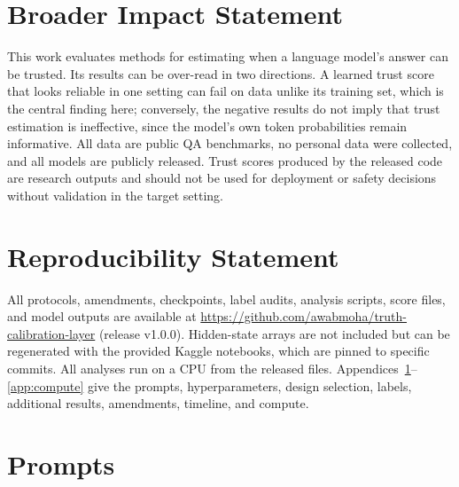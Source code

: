 \documentclass[10pt]{article}
\newif\ifanon
\newcommand{\repo}{\ifanon an anonymized repository provided with the submission\else \url{https://github.com/awabmoha/truth-calibration-layer}\fi}
\begin{document}
\section*{Broader Impact Statement}

This work evaluates methods for estimating when a language model's answer can be trusted. Its results can be over-read in two directions. A learned trust score that looks reliable in one setting can fail on data unlike its training set, which is the central finding here; conversely, the negative results do not imply that trust estimation is ineffective, since the model's own token probabilities remain informative. All data are public QA benchmarks, no personal data were collected, and all models are publicly released. Trust scores produced by the released code are research outputs and should not be used for deployment or safety decisions without validation in the target setting.

\section*{Reproducibility Statement}

All protocols, amendments, checkpoints, label audits, analysis scripts, score files, and model outputs are available at \repo\ifanon\else{} (release v1.0.0)\fi. Hidden-state arrays are not included but can be regenerated with the provided Kaggle notebooks, which are pinned to specific commits. All analyses run on a CPU from the released files. Appendices~\ref{app:prompts}--\ref{app:compute} give the prompts, hyperparameters, design selection, labels, additional results, amendments, timeline, and compute.




\appendix

\section{Prompts}
\label{app:prompts}
\end{document}
